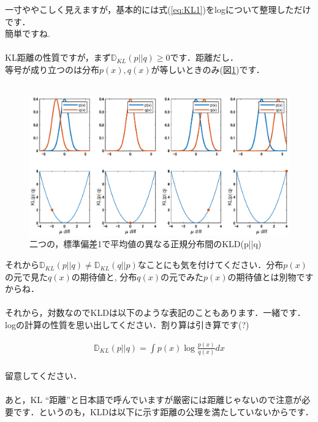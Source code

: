 \documentclass[11pt,a4paper,dvipdfmx]{ujreport}
\begin{document}
一寸ややこしく見えますが，基本的には式(\ref{eq:KL1})をlogについて整理しただけです．\\簡単ですね.\\
\\

KL距離の性質ですが，まず$\mathbb{D}_{KL}(p||q) \geq 0$です．距離だし．\\
等号が成り立つのは分布$p(x), q(x)$が等しいときのみ(図\ref{im:kld1})です．\\
\\
\begin{figure}[H]
  \label{im:kld1}
  \centering
  \includegraphics[width=18cm]{../figures/kld.eps}
  \caption{二つの，標準偏差1で平均値の異なる正規分布間のKLD(p||q)}
\end{figure}

それから$\mathbb{D}_{KL}(p||q) \neq \mathbb{D}_{KL}(q||p)$なことにも気を付けてください．分布$p(x)$の元で見た$q(x)$の期待値と, 分布$q(x)$の元でみた$p(x)$の期待値とは別物ですからね．\\
\\

それから，対数なのでKLDは以下のような表記のこともあります．一緒です．logの計算の性質を思い出してください．割り算は引き算です(?)

\begin{eqnarray}
\label{eq:KLD-inv}
  \mathbb{D}_{KL}(p||q) =  \int p(x) \log \frac{p(x)}{q(x)} dx
\end{eqnarray}
\\
留意してください．\\
\\

あと，KL ``距離''と日本語で呼んでいますが厳密には距離じゃないので注意が必要です．というのも，KLDは以下に示す距離の公理\cite{distance}を満たしていないからです．\\
\\
\end{document}
